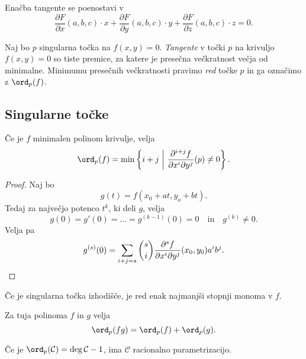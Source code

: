 \begin{posledica}
Enačba tangente se poenostavi v
\[
\frac{\partial F}{\partial x}(a,b,c) \cdot x +
\frac{\partial F}{\partial y}(a,b,c) \cdot y +
\frac{\partial F}{\partial z}(a,b,c) \cdot z =
0.
\]
\end{posledica}

\begin{definicija}
Naj bo $p$ singularna točka na $f(x, y) = 0$. \emph{Tangente}
v točki $p$ na krivuljo $f(x, y) = 0$ so tiste premice, za
katere je presečna večkratnost večja od minimalne. Minimumu
presečnih večkratnosti pravimo \emph{red} točke
$p$ in ga označimo z $\ord_p(f)$.
\end{definicija}

\newpage

\subsection{Singularne točke}


\begin{trditev}
Če je $f$ minimalen polinom krivulje, velja
\[
\ord_p(f) = \min \setb{i + j}
{\frac{\partial^{i+j} f}{\partial x^i \partial y^j}(p) \ne 0}.
\]
\end{trditev}

\begin{proof}
Naj bo
\[
g(t) = f(x_0 + at, y_o + bt).
\]
Tedaj za največjo potenco $t^k$, ki deli $g$, velja
\[
g(0) = g'(0) = \dots = g^{(k-1)}(0) = 0
\quad \text{in} \quad
g^{(k)} \ne 0.
\]
Velja pa
\[
g^{(s)}(0) = \sum_{i + j = s} \binom{s}{i}
\frac{\partial^s f}{\partial x^i \partial y^j} (x_0, y_0) a^ib^j.
\qedhere
\]
\end{proof}

\begin{opomba}
Če je singularna točka izhodišče, je red enak najmanjši stopnji
monoma v $f$.
\end{opomba}

\begin{posledica}
Za tuja polinoma $f$ in $g$ velja
\[
\ord_p(fg) = \ord_p(f) + \ord_p(g).
\]
\end{posledica}

\obvs

\begin{posledica}
Če je $\ord_p(\mathcal{C}) = \deg \mathcal{C} - 1$, ima
$\mathcal{C}$ racionalno parametrizacijo.
\end{posledica}

